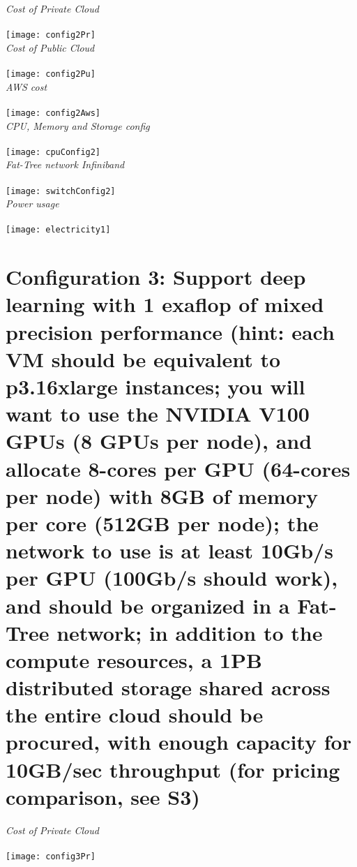 \documentclass[1pt]{article}
\begin{document}
\setlength{\parskip}{1.2em}
\setlength{\parindent}{0em}

\emph{Cost of Private Cloud }\\
\\
\texttt{[image: config2Pr]}\\

\emph{Cost of Public Cloud }\\
\\
\texttt{[image: config2Pu]}\\

\emph{AWS cost }\\
\\
\texttt{[image: config2Aws]}\\

\emph{CPU, Memory and Storage config }\\
\\
\texttt{[image: cpuConfig2]}\\

\emph{Fat-Tree network Infiniband}\\
\\
\texttt{[image: switchConfig2]}\\

\emph{Power usage}\\
\\
\texttt{[image: electricity1]}\\

\section{Configuration 3: Support deep learning with 1 exaflop of mixed precision performance (hint: each VM
should be equivalent to p3.16xlarge instances; you will want to use the NVIDIA V100 GPUs (8 GPUs per
node), and allocate 8-cores per GPU (64-cores per node) with 8GB of memory per core (512GB per node);
the network to use is at least 10Gb/s per GPU (100Gb/s should work), and should be organized in a Fat-Tree
network; in addition to the compute resources, a 1PB distributed storage shared across the entire cloud
should be procured, with enough capacity for 10GB/sec throughput (for pricing comparison, see S3)}

\setlength{\parskip}{1.2em}
\setlength{\parindent}{0em}

\emph{Cost of Private Cloud }\\
\\
\texttt{[image: config3Pr]}\\
\end{document}
